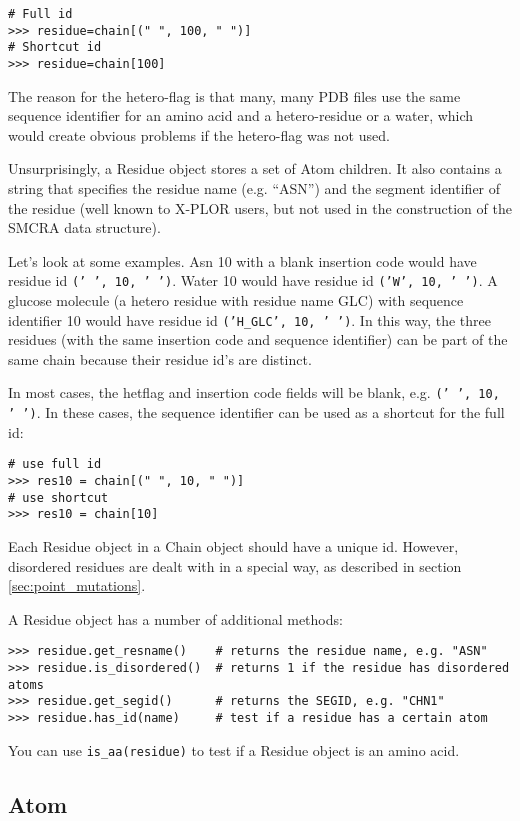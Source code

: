 \begin{verbatim}
# Full id
>>> residue=chain[(" ", 100, " ")]
# Shortcut id
>>> residue=chain[100]
\end{verbatim}
The reason for the hetero-flag is that many, many PDB files use the
same sequence identifier for an amino acid and a hetero-residue or
a water, which would create obvious problems if the hetero-flag was
not used.

Unsurprisingly, a Residue object stores a set of Atom children. It also contains a string that specifies the residue name (e.g. ``ASN'')
and the segment identifier of the residue (well known to X-PLOR users, but not
used in the construction of the SMCRA data structure).

Let's look at some examples. Asn 10 with a blank insertion code would have residue
id \texttt{(' ', 10, ' ')}. Water 10 would have residue id \texttt{('W', 10, ' ')}.
A glucose molecule (a hetero residue with residue name GLC) with sequence identifier
10 would have residue id \texttt{('H\_GLC', 10, ' ')}. In this way, the three
residues (with the same insertion code and sequence identifier) can be part
of the same chain because their residue id's are distinct.

In most cases, the hetflag and insertion code fields will be blank, e.g. \texttt{(' ', 10, ' ')}.
In these cases, the sequence identifier can be used as a shortcut for the full
id:

\begin{verbatim}
# use full id
>>> res10 = chain[(" ", 10, " ")]
# use shortcut
>>> res10 = chain[10]
\end{verbatim}

Each Residue object in a Chain object should have a unique id. However, disordered
residues are dealt with in a special way, as described in section \ref{sec:point_mutations}.

A Residue object has a number of additional methods:

\begin{verbatim}
>>> residue.get_resname()    # returns the residue name, e.g. "ASN"
>>> residue.is_disordered()  # returns 1 if the residue has disordered atoms
>>> residue.get_segid()      # returns the SEGID, e.g. "CHN1"
>>> residue.has_id(name)     # test if a residue has a certain atom
\end{verbatim}

You can use \texttt{is\_aa(residue)} to test if a Residue object is an amino acid.

\subsection{Atom}

